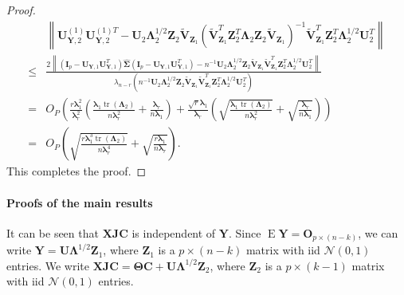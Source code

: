 \documentclass[12pt]{article} %
\DeclareMathOperator{\mytr}{tr}
\DeclareMathOperator{\myE}{E}
\newcommand{\bZ}{\mathbf{Z}}
\newcommand{\bX}{\mathbf{X}}
\newcommand{\bY}{\mathbf{Y}}
\newcommand{\bJ}{\mathbf{J}}
\newcommand{\bC}{\mathbf{C}}
\newcommand{\bO}{\mathbf{O}}
\newcommand{\bI}{\mathbf{I}}
\newcommand{\bU}{\mathbf{U}}
\newcommand{\bV}{\mathbf{V}}
\newcommand{\bfsym}[1]{\ensuremath{\boldsymbol{#1}}}
\def\blambda {\bfsym {\lambda}}
\def\bLambda {\bfsym {\Lambda}}
\def\bSigma {\bfsym {\Sigma}}
\def\bTheta {\bfsym {\Theta}}
\theoremstyle{definition}
\begin{document}
\begin{appendices}
\begin{proof}
\begin{equation*}
        \begin{split}
            &\left\|\bU_{\bY,2}^{(1)}\bU_{\bY,2}^{(1)T}-
            \bU_2 \bLambda_2^{1/2}\bZ_{2} \tilde{\bV}_{\bZ_1}
            \left(\tilde{\bV}_{\bZ_1}^T \bZ_2^T \bLambda_2 \bZ_2 \tilde{\bV}_{\bZ_1}\right)^{-1}
            \tilde{\bV}_{\bZ_1}^T \bZ_2^T \bLambda_2^{1/2} \bU_2^T
            \right\|
            \\
             \leq&
             \frac{
                 2\left\|(\bI_p -\bU_{\bY,1}\bU_{\bY,1}^T)\hat{\bSigma}(\bI_p -\bU_{\bY,1}\bU_{\bY,1}^T)
             -
         n^{-1}\bU_2 \bLambda_2^{1/2} \bZ_2 \tilde{\bV}_{\bZ_1}\tilde{\bV}_{\bZ_1}^T  \bZ_2^T \bLambda_2^{1/2} \bU_2^T
             \right\|
         }{
        \lambda_{n-r}\left(
            n^{-1}\bU_2 \bLambda_2^{1/2} \bZ_2 \tilde{\bV}_{\bZ_1}\tilde{\bV}_{\bZ_1}^T  \bZ_2^T \bLambda_2^{1/2} \bU_2^T
        \right)
         }
         \\
         =&
        O_P\left(
                    \frac{r\blambda_1^2}{\blambda_r^2}
                    \left(
\frac{\blambda_1 \mytr(\bLambda_2)}{n\blambda_r^2}
+\frac{\blambda_r}{n\blambda_1}
                    \right)
                 +\frac{\sqrt{r} \blambda_1 }{ \blambda_r}
                    \left(
\sqrt{\frac{\blambda_1 \mytr(\bLambda_2)}{n\blambda_r^2}}
+\sqrt{\frac{\blambda_r}{n\blambda_1}}
                    \right)
                \right)
         \\
         =&
        O_P\left(
\sqrt{\frac{r\blambda_1^3 \mytr(\bLambda_2)}{n\blambda_r^4}}
+\sqrt{\frac{r\blambda_1}{n\blambda_r}}
                \right).
        \end{split}
    \end{equation*}
    This completes the proof.


\end{proof}




\paragraph{Proofs of the main results}

It can be seen that $\bX\bJ\bC$ is independent of $\bY$.
Since
$
\myE \bY = \bO_{p\times (n-k)}
$,
we can write
$
\bY = \bU\bLambda^{1/2} \bZ_1
$,
where $\bZ_1$ is a $p\times (n-k)$ matrix with iid $\mathcal{N}(0,1)$ entries.
We write
$
\bX\bJ\bC = \bTheta \bC + \bU\bLambda^{1/2} \bZ_2
$, 
where $\bZ_2$ is a $p\times (k-1)$ matrix with iid $\mathcal{N}(0,1)$ entries.


\end{appendices}
\end{document}
